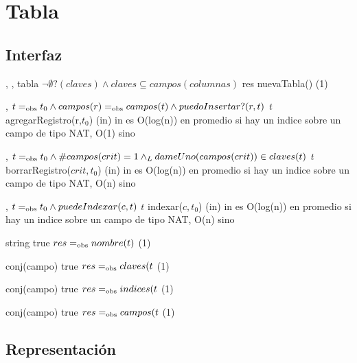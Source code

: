 \section{Tabla}

\subsection{Interfaz}

\iusa{}

\ioperaciones

{   ,
    ,
    } %
{tabla} %
{$\neg\emptyset?(claves) \land claves \subseteq campos(columnas)$} %
{res \igobs nuevaTabla()} %
{\bigo(1)} %
{} %
{} %

{   ,
    }
{}
{$t =_{\mathrm{obs}} t_0 \land campos(r) =_{\mathrm{obs}} campos(t) \land puedoInsertar?(r,t)$}
{$t$ \igobs agregarRegistro(r,$t_0$)}
{\bigo(in)}
{}
{in es O(log(n)) en promedio si hay un indice sobre un campo de tipo NAT, O(1) sino}

{   ,
    }
{}
{$t =_{\mathrm{obs}} t_0 \land \#campos(crit) = 1 \land_L dameUno(campos(crit)) \in claves(t)$}
{$t$ \igobs borrarRegistro($crit,t_0$)}
{\bigo(in)}
{}
{in es O(log(n)) en promedio si hay un indice sobre un campo de tipo NAT, O(n) sino}

{   ,
    }
{}
{$t =_{\mathrm{obs}} t_0 \land puedeIndexar(c,t)$}
{$t$ \igobs indexar($c,t_0$)}
{\bigo(in)}
{}
{in es O(log(n)) en promedio si hay un indice sobre un campo de tipo NAT, O(n) sino}

{   }
{string}
{true}
{$res =_{\mathrm{obs}} nombre(t)$}
{\bigo(1)}
{}
{}

{   }
{conj(campo)}
{true}
{$res =_{\mathrm{obs}} claves(t$}
{\bigo(1)}
{}
{}

{   }
{conj(campo)}
{true}
{$res =_{\mathrm{obs}} indices(t$}
{\bigo(1)}
{}
{}

{   }
{conj(campo)}
{true}
{$res =_{\mathrm{obs}} campos(t$}
{\bigo(1)}
{}
{}

\subsection{Representación}

